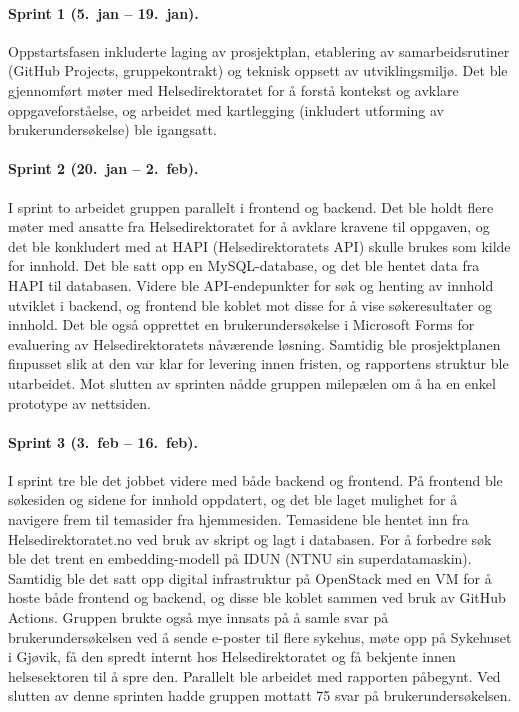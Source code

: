 \paragraph{Sprint 1 (5.\ jan -- 19.\ jan).}
Oppstartsfasen inkluderte laging av prosjektplan, etablering av samarbeidsrutiner (GitHub Projects, gruppekontrakt) og teknisk oppsett av utviklingsmiljø. Det ble gjennomført møter med Helsedirektoratet for å forstå kontekst og avklare oppgaveforståelse, og arbeidet med kartlegging (inkludert utforming av brukerundersøkelse) ble igangsatt.

\paragraph{Sprint 2 (20.\ jan -- 2.\ feb).}
I sprint to arbeidet gruppen parallelt i frontend og backend. Det ble holdt flere møter med ansatte fra Helsedirektoratet for å avklare kravene til oppgaven, og det ble konkludert med at HAPI (Helsedirektoratets API) skulle brukes som kilde for innhold. Det ble satt opp en MySQL-database, og det ble hentet data fra HAPI til databasen. Videre ble API-endepunkter for søk og henting av innhold utviklet i backend, og frontend ble koblet mot disse for å vise søkeresultater og innhold. Det ble også opprettet en brukerundersøkelse i Microsoft Forms for evaluering av Helsedirektoratets nåværende løsning. Samtidig ble prosjektplanen finpusset slik at den var klar for levering innen fristen, og rapportens struktur ble utarbeidet. Mot slutten av sprinten nådde gruppen milepælen om å ha en enkel prototype av nettsiden.

\paragraph{Sprint 3 (3.\ feb -- 16.\ feb).}
I sprint tre ble det jobbet videre med både backend og frontend. På frontend ble søkesiden og sidene for innhold oppdatert, og det ble laget mulighet for å navigere frem til temasider fra hjemmesiden. Temasidene ble hentet inn fra Helsedirektoratet.no ved bruk av skript og lagt i databasen. For å forbedre søk ble det trent en embedding-modell på IDUN (NTNU sin superdatamaskin). Samtidig ble det satt opp digital infrastruktur på OpenStack med en VM for å hoste både frontend og backend, og disse ble koblet sammen ved bruk av GitHub Actions. Gruppen brukte også mye innsats på å samle svar på brukerundersøkelsen ved å sende e-poster til flere sykehus, møte opp på Sykehuset i Gjøvik, få den spredt internt hos Helsedirektoratet og få bekjente innen helsesektoren til å spre den. Parallelt ble arbeidet med rapporten påbegynt. Ved slutten av denne sprinten hadde gruppen mottatt 75 svar på brukerundersøkelsen.

